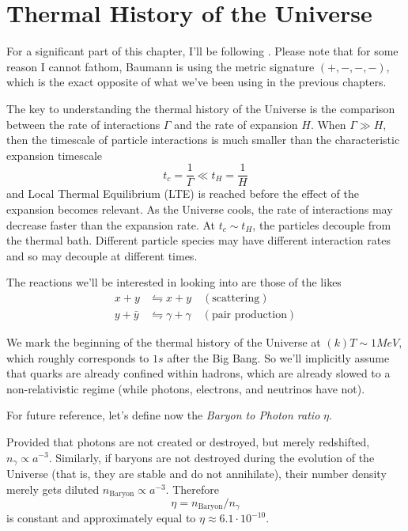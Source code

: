 
\chapter{Thermal History of the Universe} \label{ch:v}

For a significant part of this chapter, I'll be following \cite{Baumann_2022}. Please note that for some reason I cannot fathom, Baumann is using the metric signature $(+,-,-,-)$, which is the exact opposite of what we've been using in the previous chapters.
\par The key to understanding the thermal history of the Universe is the comparison between the rate of interactions $\Gamma$ and the rate of expansion $H$. When $\Gamma \gg H$, then the timescale of particle interactions is much smaller than the characteristic expansion timescale
\begin{equation}
    t_{c} = \frac{1}{\Gamma} \ll t_{H} = \frac{1}{H}
\end{equation}
and Local Thermal Equilibrium (LTE) is reached before the effect of the expansion becomes relevant. As the Universe cools, the rate of interactions may decrease faster than the expansion rate. At $t_{c} \sim t_{H}$, the particles decouple from the thermal bath. Different particle species may have different interaction rates and so may decouple at different times.
\par The reactions we'll be interested in looking into are those of the likes 
\begin{align*}
    x + y &\leftrightharpoons x + y \quad (\text{scattering})\\
    y + \bar{y} &\leftrightharpoons \gamma + \gamma \quad (\text{pair production})
\end{align*}
\par We mark the beginning of the thermal history of the Universe at $(k)T \sim 1\unit{MeV}$, which roughly corresponds to $1\unit{s}$ after the Big Bang. So we'll implicitly assume that quarks are already confined within hadrons, which are already slowed to a non-relativistic regime (while photons, electrons, and neutrinos have not).

\begin{tcolorbox}[enhanced,attach boxed title to top center={yshift=-3mm,yshifttext=-1mm},
  colback=blue!5!white,colframe=blue!75!black,colbacktitle=blue!80!black,
  title=Baryon to Photon Ratio,
  boxed title style={size=small,colframe=blue!50!black}]
  For future reference, let's define now the \emph{Baryon to Photon ratio} $\eta$.
  \par Provided that photons are not created or destroyed, but merely redshifted, $n_{\gamma} \propto a^{-3}$. Similarly, if baryons are not destroyed during the evolution of the Universe (that is, they are stable and do not annihilate), their number density merely gets diluted $n_{\text{Baryon}} \propto a^{-3}$. Therefore $$\eta = n_{\text{Baryon}}/n_{\gamma}$$ is constant and approximately equal to $\eta \approx 6.1 \cdot 10^{-10}$.
\end{tcolorbox}

